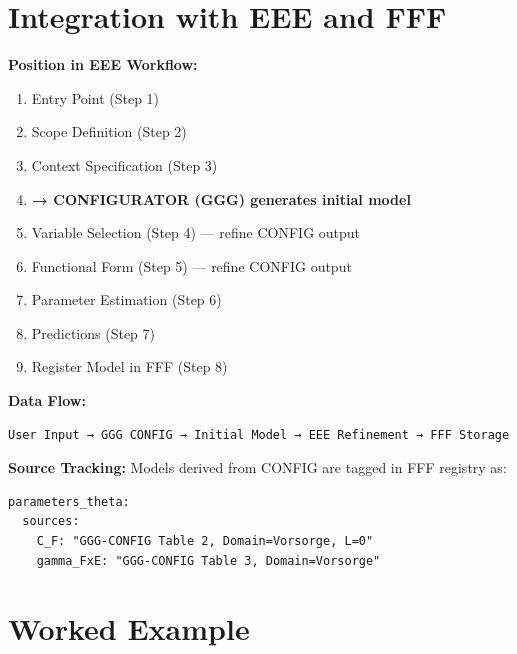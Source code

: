 \section{Integration with EEE and FFF}
\label{sec:ggg-integration}

\begin{tcolorbox}[colback=yellow!5!white, colframe=yellow!75!black,
    title=Integration: METHOD-CONFIG in the Workflow]

\textbf{Position in EEE Workflow:}
\begin{enumerate}
\item Entry Point (Step 1)
\item Scope Definition (Step 2)
\item Context Specification (Step 3)
\item \textbf{→ CONFIGURATOR (GGG) generates initial model}
\item Variable Selection (Step 4) --- refine CONFIG output
\item Functional Form (Step 5) --- refine CONFIG output
\item Parameter Estimation (Step 6)
\item Predictions (Step 7)
\item Register Model in FFF (Step 8)
\end{enumerate}

\textbf{Data Flow:}
\begin{verbatim}
User Input → GGG CONFIG → Initial Model → EEE Refinement → FFF Storage
\end{verbatim}

\textbf{Source Tracking:}
Models derived from CONFIG are tagged in FFF registry as:
\begin{verbatim}
parameters_theta:
  sources:
    C_F: "GGG-CONFIG Table 2, Domain=Vorsorge, L=0"
    gamma_FxE: "GGG-CONFIG Table 3, Domain=Vorsorge"
\end{verbatim}
\end{tcolorbox}



\section{Worked Example}
\label{sec:ggg-example}

